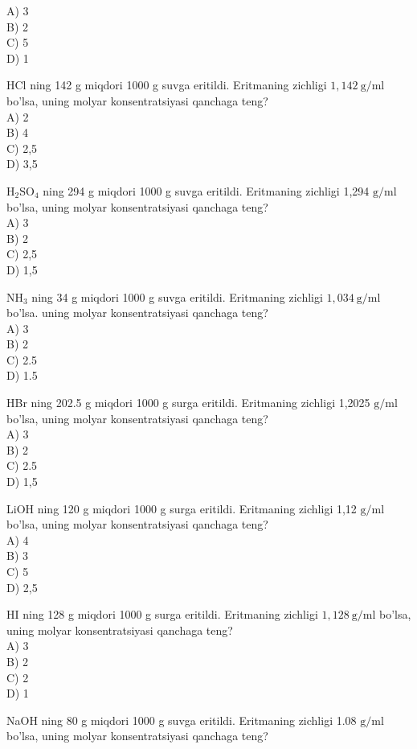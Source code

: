 A) 3\\
B) 2\\
C) 5\\
D) 1
  \item HCl ning 142 g miqdori 1000 g suvga eritildi. Eritmaning zichligi $1,142 \mathrm{~g} / \mathrm{ml}$ bo'lsa, uning molyar konsentratsiyasi qanchaga teng?\\
A) 2\\
B) 4\\
C) 2,5\\
D) 3,5
  \item $\mathrm{H}_{2} \mathrm{SO}_{4}$ ning 294 g miqdori 1000 g suvga eritildi. Eritmaning zichligi 1,294 $\mathrm{g} / \mathrm{ml}$ bo'lsa, uning molyar konsentratsiyasi qanchaga teng?\\
A) 3\\
B) 2\\
C) 2,5\\
D) 1,5
  \item $\mathrm{NH}_{3}$ ning 34 g miqdori 1000 g suvga eritildi. Eritmaning zichligi $1,034 \mathrm{~g} / \mathrm{ml}$\\
bo'lsa. uning molyar konsentratsiyasi qanchaga teng?\\
A) 3\\
B) 2\\
C) 2.5\\
D) 1.5
  \item HBr ning 202.5 g miqdori 1000 g surga eritildi. Eritmaning zichligi 1,2025 $\mathrm{g} / \mathrm{ml}$ bo'lsa, uning molyar konsentratsiyasi qanchaga teng?\\
A) 3\\
B) 2\\
C) 2.5\\
D) 1,5
  \item LiOH ning 120 g miqdori 1000 g surga eritildi. Eritmaning zichligi 1,12 $\mathrm{g} / \mathrm{ml}$ bo'lsa, uning molyar konsentratsiyasi qanchaga teng?\\
A) 4\\
B) 3\\
C) 5\\
D) 2,5
  \item HI ning 128 g miqdori 1000 g surga eritildi. Eritmaning zichligi $1,128 \mathrm{~g} / \mathrm{ml}$ bo'lsa, uning molyar konsentratsiyasi qanchaga teng?\\
A) 3\\
B) 2\\
C) 2\\
D) 1
  \item NaOH ning 80 g miqdori 1000 g suvga eritildi. Eritmaning zichligi 1.08 $\mathrm{g} / \mathrm{ml}$ bo'lsa, uning molyar konsentratsiyasi qanchaga teng?\\
